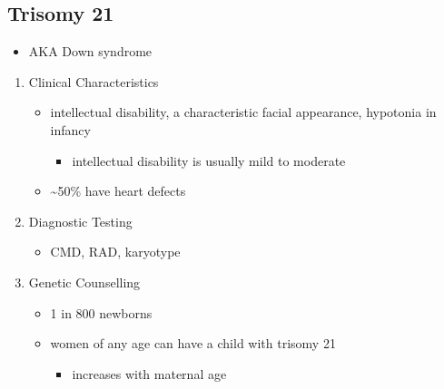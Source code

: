 \documentclass[12pt]{scrartcl}
\begin{document}
\subsection{Trisomy 21}
\label{sec:org9a7f8dd}
\begin{itemize}
\item AKA Down syndrome
\end{itemize}
\begin{enumerate}
\item Clinical Characteristics
\label{sec:org2e0c196}
\begin{itemize}
\item intellectual disability, a characteristic facial appearance, hypotonia in infancy
\begin{itemize}
\item intellectual disability is usually mild to moderate
\end{itemize}
\item \textasciitilde{}50\% have heart defects
\end{itemize}
\item Diagnostic Testing
\label{sec:org23dcc0a}
\begin{itemize}
\item CMD, RAD, karyotype
\end{itemize}

\item Genetic Counselling
\label{sec:orgd80d7a2}
\begin{itemize}
\item 1 in 800 newborns
\item women of any age can have a child with trisomy 21
\begin{itemize}
\item increases with maternal age
\end{itemize}
\end{itemize}
\end{enumerate}
\end{document}
